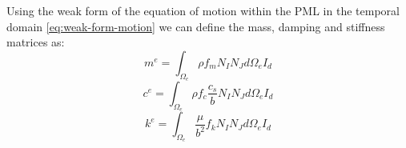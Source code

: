 Using the weak form of the equation of motion within the PML in the temporal domain \ref{eq:weak-form-motion} we can define the mass, damping and stiffness matrices as:
\begin{equation}
m^{e} = \int_{\Omega_e} \rho f_m N_I N_J d\Omega_e I_d
\end{equation}
\begin{equation}
 c^{e} = \int_{\Omega_e} \rho f_c \frac{c_s}{b} N_I N_J d\Omega_e I_d
\end{equation}
\begin{equation}
  k^{e} = \int_{\Omega_e} \frac{\mu}{b^2} f_k N_I N_J d\Omega_e I_d 
\end{equation}





 





